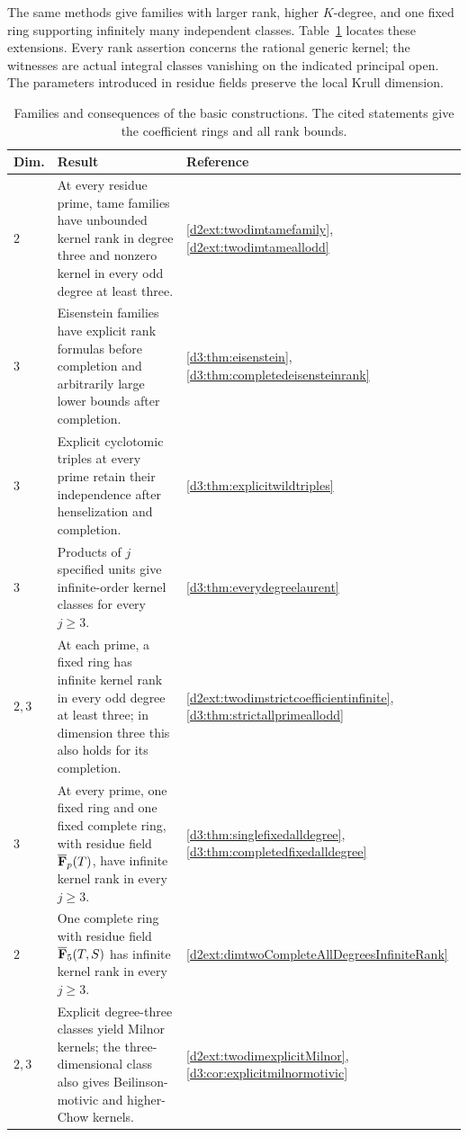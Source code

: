 The same methods give families with larger rank, higher $K$-degree,
and one fixed ring supporting infinitely many independent classes.
Table~\ref{tab:intro-results} locates these extensions. Every rank
assertion concerns the rational generic kernel; the witnesses are
actual integral classes vanishing on the indicated principal open.
The parameters introduced in residue fields preserve the local
Krull dimension.

\begin{table}[htbp]
\centering
\small
\renewcommand{\arraystretch}{1.18}
\begin{tabular}{@{}p{}p{}p{}@{}}
\hline
Dim. & Result & Reference\\
\hline
$2$ & At every residue prime, tame families have unbounded kernel rank
in degree three and nonzero kernel in every odd degree at least three.
& \ref{d2ext:twodimtamefamily}, \ref{d2ext:twodimtameallodd}\\
$3$ & Eisenstein families have explicit rank formulas before completion
and arbitrarily large lower bounds after completion.
& \ref{d3:thm:eisenstein}, \ref{d3:thm:completedeisensteinrank}\\
$3$ & Explicit cyclotomic triples at every prime retain their independence
after henselization and completion.
& \ref{d3:thm:explicitwildtriples}\\
$3$ & Products of $j$ specified units give infinite-order kernel classes
for every $j\geq3$.
& \ref{d3:thm:everydegreelaurent}\\
$2,3$ & At each prime, a fixed ring has infinite kernel rank in every odd
degree at least three; in dimension three this also holds for its completion.
& \ref{d2ext:twodimstrictcoefficientinfinite}, \ref{d3:thm:strictallprimeallodd}\\
$3$ & At every prime, one fixed ring and one fixed complete ring, with
residue field $\overline{\mathbf F}_p(T)$, have infinite kernel rank in every $j\geq3$.
& \ref{d3:thm:singlefixedalldegree}, \ref{d3:thm:completedfixedalldegree}\\
$2$ & One complete ring with residue field $\overline{\mathbf F}_5(T,S)$ has
infinite kernel rank in every $j\geq3$.
& \ref{d2ext:dimtwoCompleteAllDegreesInfiniteRank}\\
$2,3$ & Explicit degree-three classes yield Milnor kernels; the
three-dimensional class also gives Beilinson-motivic and higher-Chow kernels.
& \ref{d2ext:twodimexplicitMilnor}, \ref{d3:cor:explicitmilnormotivic}\\
\hline
\end{tabular}
\caption{Families and consequences of the basic constructions.
The cited statements give the coefficient rings and all rank bounds.}
\label{tab:intro-results}
\end{table}

